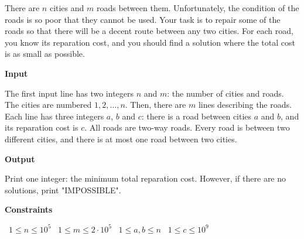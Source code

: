 There are $n$ cities and $m$ roads between them. Unfortunately, the condition of the roads is so poor that they cannot be used. Your task is to repair some of the roads so that there will be a decent route between any two cities.
For each road, you know its reparation cost, and you should find a solution where the total cost is as small as possible.

\vspace{0.3cm}\noindent\textbf{Input}

The first input line has two integers $n$ and $m$: the number of cities and roads. The cities are numbered $1,2,\dots,n$.
Then, there are $m$ lines describing the roads. Each line has three integers $a$, $b$ and $c$: there is a road between cities $a$ and $b$, and its reparation cost is $c$. All roads are two-way roads.
Every road is between two different cities, and there is at most one road between two cities.

\vspace{0.3cm}\noindent\textbf{Output}

Print one integer: the minimum total reparation cost. However, if there are no solutions, print "IMPOSSIBLE".

\vspace{0.3cm}\noindent\textbf{Constraints}

\textbullet\ $1 \le n \le 10^5$
\textbullet\ $1 \le m \le 2 \cdot 10^5$
\textbullet\ $1 \le a,b \le n$
\textbullet\ $1 \le c \le 10^9$